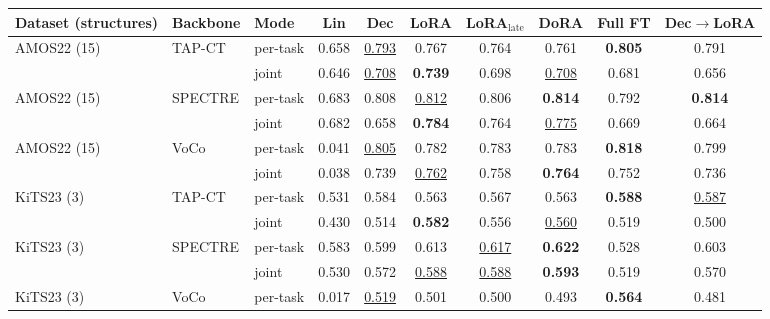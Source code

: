 \begin{tabular}{lllccccccc}
\toprule
Dataset (structures) & Backbone & Mode & Lin & Dec & LoRA & LoRA$_{\text{late}}$ & DoRA & Full FT & Dec$\to$LoRA \\
\midrule
AMOS22 (15) & TAP-CT & per-task & \cellcolor{modebest}0.658 & \cellcolor{modebest}\underline{0.793} & \cellcolor{modebest}0.767 & \cellcolor{modebest}0.764 & \cellcolor{modebest}0.761 & \cellcolor{modebest}\textbf{0.805} & \cellcolor{modebest}0.791 \\
 &  & joint & 0.646 & \underline{0.708} & \textbf{0.739} & 0.698 & \underline{0.708} & 0.681 & 0.656 \\
\addlinespace[2pt]
AMOS22 (15) & SPECTRE & per-task & \cellcolor{modebest}0.683 & \cellcolor{modebest}0.808 & \cellcolor{modebest}\underline{0.812} & \cellcolor{modebest}0.806 & \cellcolor{modebest}\textbf{0.814} & \cellcolor{modebest}0.792 & \cellcolor{modebest}\textbf{0.814} \\
 &  & joint & 0.682 & 0.658 & \textbf{0.784} & 0.764 & \underline{0.775} & 0.669 & 0.664 \\
\addlinespace[2pt]
AMOS22 (15) & VoCo & per-task & \cellcolor{modebest}0.041 & \cellcolor{modebest}\underline{0.805} & \cellcolor{modebest}0.782 & \cellcolor{modebest}0.783 & \cellcolor{modebest}0.783 & \cellcolor{modebest}\textbf{0.818} & \cellcolor{modebest}0.799 \\
 &  & joint & 0.038 & 0.739 & \underline{0.762} & 0.758 & \textbf{0.764} & 0.752 & 0.736 \\
\addlinespace[2pt]
KiTS23 (3) & TAP-CT & per-task & \cellcolor{modebest}0.531 & \cellcolor{modebest}0.584 & 0.563 & \cellcolor{modebest}0.567 & \cellcolor{modebest}0.563 & \cellcolor{modebest}\textbf{0.588} & \cellcolor{modebest}\underline{0.587} \\
 &  & joint & 0.430 & 0.514 & \cellcolor{modebest}\textbf{0.582} & 0.556 & \underline{0.560} & 0.519 & 0.500 \\
\addlinespace[2pt]
KiTS23 (3) & SPECTRE & per-task & \cellcolor{modebest}0.583 & \cellcolor{modebest}0.599 & \cellcolor{modebest}0.613 & \cellcolor{modebest}\underline{0.617} & \cellcolor{modebest}\textbf{0.622} & \cellcolor{modebest}0.528 & \cellcolor{modebest}0.603 \\
 &  & joint & 0.530 & 0.572 & \underline{0.588} & \underline{0.588} & \textbf{0.593} & 0.519 & 0.570 \\
\addlinespace[2pt]
KiTS23 (3) & VoCo & per-task & 0.017 & \cellcolor{modebest}\underline{0.519} & 0.501 & 0.500 & 0.493 & \cellcolor{modebest}\textbf{0.564} & \cellcolor{modebest}0.481 \\

\end{tabular}
